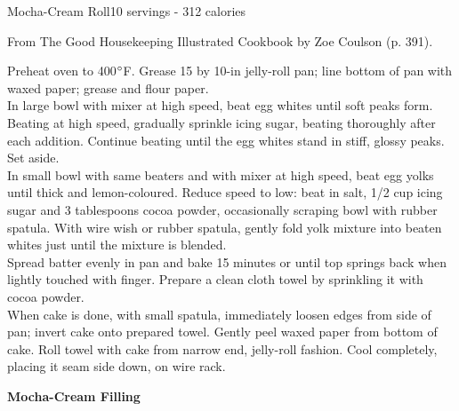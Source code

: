 \begin{recipe}{Mocha-Cream Roll}{10 servings - 312 calories}{}

\freeform From {\normalfont The Good Housekeeping Illustrated Cookbook} by Zoe Coulson (p. 391).


Preheat oven to 400$\degree$F. Grease 15 by 10-in jelly-roll pan; line bottom of pan with waxed paper; grease and flour paper.\\

In large bowl with mixer at high speed, beat egg whites until soft peaks form. Beating at high speed, gradually sprinkle icing sugar, beating thoroughly after each addition. Continue beating until the egg whites stand in stiff, glossy peaks. Set aside.\\

In small bowl with same beaters and with mixer at high speed, beat egg yolks until thick and lemon-coloured. Reduce speed to low: beat in salt, 1/2 cup icing sugar and 3 tablespoons cocoa powder, occasionally scraping bowl with rubber spatula. With wire wish or rubber spatula, gently fold yolk mixture into beaten whites just until the mixture is blended.\\

Spread batter evenly in pan and bake 15 minutes or until top springs back when lightly touched with finger. Prepare a clean cloth towel by sprinkling it with cocoa powder.\\

When cake is done, with small spatula, immediately loosen edges from side of pan; invert cake onto prepared towel. Gently peel waxed paper from bottom of cake. Roll towel with cake from narrow end, jelly-roll fashion. Cool completely, placing it seam side down, on wire rack.\newpage

\textbf{Mocha-Cream Filling}


\end{recipe}
